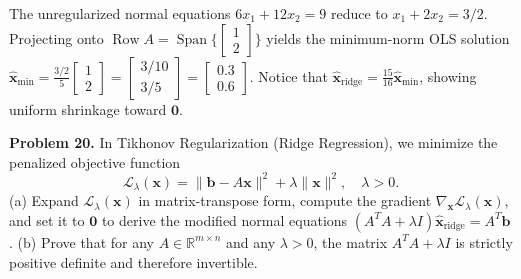 \documentclass[11pt, letterpaper]{article}
\theoremstyle{definition}
\theoremstyle{remark}
\begin{document}
The unregularized normal equations $6x_1 + 12x_2 = 9$ reduce to $x_1 + 2x_2 = 3/2$. Projecting onto $\operatorname{Row} A = \operatorname{Span}\{\begin{bmatrix} 1 \\ 2 \end{bmatrix}\}$ yields the minimum-norm OLS solution $\hat{\mathbf{x}}_{\min} = \frac{3/2}{5}\begin{bmatrix} 1 \\ 2 \end{bmatrix} = \begin{bmatrix} 3/10 \\ 3/5 \end{bmatrix} = \begin{bmatrix} 0.3 \\ 0.6 \end{bmatrix}$. Notice that $\hat{\mathbf{x}}_{\text{ridge}} = \frac{15}{16}\hat{\mathbf{x}}_{\min}$, showing uniform shrinkage toward $\mathbf{0}$.

\textbf{Problem 20.} In Tikhonov Regularization (Ridge Regression), we minimize the penalized objective function
\[
\mathcal{L}_{\lambda}(\mathbf{x}) = \|\mathbf{b} - A\mathbf{x}\|^2 + \lambda \|\mathbf{x}\|^2, \quad \lambda > 0.
\]
(a) Expand $\mathcal{L}_{\lambda}(\mathbf{x})$ in matrix-transpose form, compute the gradient $\nabla_{\mathbf{x}} \mathcal{L}_{\lambda}(\mathbf{x})$, and set it to $\mathbf{0}$ to derive the modified normal equations $(A^T A + \lambda I)\hat{\mathbf{x}}_{\text{ridge}} = A^T \mathbf{b}$. (b) Prove that for any $A \in \mathbb{R}^{m \times n}$ and any $\lambda > 0$, the matrix $A^T A + \lambda I$ is strictly positive definite and therefore invertible.
\end{document}
